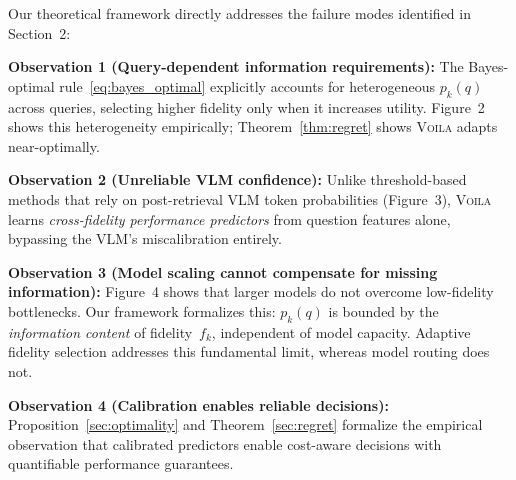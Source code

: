 Our theoretical framework directly addresses the failure modes identified in Section~2:

\textbf{Observation 1 (Query-dependent information requirements):}
The Bayes-optimal rule~\eqref{eq:bayes_optimal} explicitly accounts for heterogeneous
$p_k(q)$ across queries, selecting higher fidelity only when it increases utility.
Figure~2 shows this heterogeneity empirically; Theorem~\ref{thm:regret} shows
\textsc{Voila} adapts near-optimally.

\textbf{Observation 2 (Unreliable VLM confidence):}
Unlike threshold-based methods that rely on post-retrieval VLM token probabilities
(Figure~3), \textsc{Voila} learns \emph{cross-fidelity performance predictors} from
question features alone, bypassing the VLM's miscalibration entirely.

\textbf{Observation 3 (Model scaling cannot compensate for missing information):}
Figure~4 shows that larger models do not overcome low-fidelity bottlenecks.
Our framework formalizes this: $p_k(q)$ is bounded by the \emph{information content}
of fidelity~$f_k$, independent of model capacity. Adaptive fidelity selection addresses
this fundamental limit, whereas model routing does not.

\textbf{Observation 4 (Calibration enables reliable decisions):}
Proposition~\ref{sec:optimality} and Theorem~\ref{sec:regret} formalize the empirical
observation that calibrated predictors enable cost-aware decisions with quantifiable
performance guarantees.